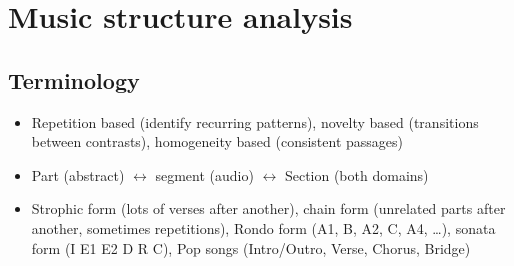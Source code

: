 \documentclass[fleqn,12pt]{scrartcl}
\begin{document}
\section{Music structure analysis}
\subsection{Terminology}
\begin{itemize}
	\item Repetition based (identify recurring patterns), novelty based (transitions between contrasts), homogeneity based (consistent passages)
	\item Part (abstract) $\leftrightarrow$ segment (audio) $\leftrightarrow$
		Section (both domains)
	\item
		Strophic form (lots of verses after another), chain form (unrelated parts after another, sometimes repetitions), Rondo form (A1, B, A2, C, A4, \dots), sonata form (I E1 E2 D R C), Pop songs (Intro/Outro, Verse, Chorus, Bridge)
\end{itemize}
\end{document}
